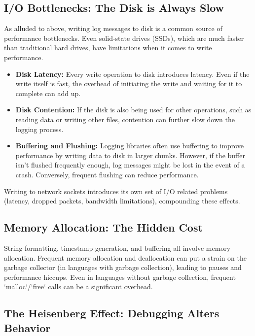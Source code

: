 \documentclass{article}
\begin{document}
{{{{\subsection*{I/O Bottlenecks: The Disk is Always Slow}

As alluded to above, writing log messages to disk is a common source of performance bottlenecks. Even solid-state drives (SSDs), which are much faster than traditional hard drives, have limitations when it comes to write performance.

\begin{itemize}
    \item \textbf{Disk Latency:} Every write operation to disk introduces latency. Even if the write itself is fast, the overhead of initiating the write and waiting for it to complete can add up.
    \item \textbf{Disk Contention:} If the disk is also being used for other operations, such as reading data or writing other files, contention can further slow down the logging process.
    \item \textbf{Buffering and Flushing:} Logging libraries often use buffering to improve performance by writing data to disk in larger chunks. However, if the buffer isn't flushed frequently enough, log messages might be lost in the event of a crash. Conversely, frequent flushing can reduce performance.
\end{itemize}

Writing to network sockets introduces its own set of I/O related problems (latency, dropped packets, bandwidth limitations), compounding these effects.

\subsection*{Memory Allocation: The Hidden Cost}

String formatting, timestamp generation, and buffering all involve memory allocation. Frequent memory allocation and deallocation can put a strain on the garbage collector (in languages with garbage collection), leading to pauses and performance hiccups.  Even in languages without garbage collection, frequent `malloc`/`free` calls can be a significant overhead.

\subsection*{The Heisenberg Effect: Debugging Alters Behavior}

}}}}
\end{document}
